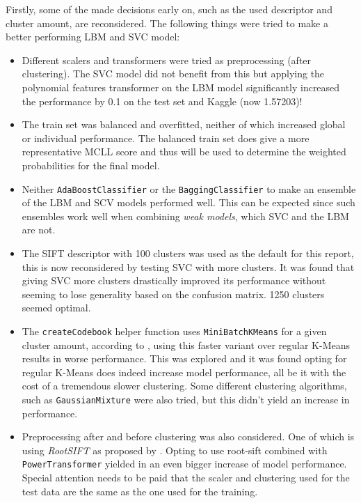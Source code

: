 Firstly, some of the made decisions early on, such as the used descriptor and cluster amount, are reconsidered.
The following things were tried to make a better performing LBM and SVC model: 
\begin{itemize}
    \item Different scalers and transformers were tried as preprocessing (after clustering). The SVC model did not benefit from this but applying the polynomial features transformer on the LBM model significantly increased the performance by 0.1 on the test set and Kaggle (now 1.57203)!
    \item The train set was balanced and overfitted, neither of which increased global or individual performance. The balanced train set does give a more representative MCLL score and thus will be used to determine the weighted probabilities for the final model.
    \item Neither \texttt{AdaBoostClassifier} or the \texttt{BaggingClassifier} to make an ensemble of the LBM and SCV models performed well. This can be expected since such ensembles work well when combining \textit{weak models}, which SVC and the LBM are not.
    \item The SIFT descriptor with 100 clusters was used as the default for this report, this is now reconsidered by testing SVC with more clusters. It was found that giving SVC more clusters drastically improved its performance without seeming to lose generality based on the confusion matrix. 1250 clusters seemed optimal.
    \item The \texttt{createCodebook} helper function uses \texttt{MiniBatchKMeans} for a given cluster amount, according to \citet{kmeansvsmini}, using this faster variant over regular K-Means results in worse performance. This was explored and it was found opting for regular K-Means does indeed increase model performance, all be it with the cost of a tremendous slower clustering. Some different clustering algorithms, such as \texttt{GaussianMixture} were also tried, but this didn't yield an increase in performance.
    \item Preprocessing after and before clustering was also considered. One of which is using \textit{RootSIFT} as proposed by \citet{rootsift}. Opting to use root-sift combined with \texttt{PowerTransformer} yielded in an even bigger increase of model performance. Special attention needs to be paid that the scaler and clustering used for the test data are the same as the one used for the training. 
\end{itemize}

